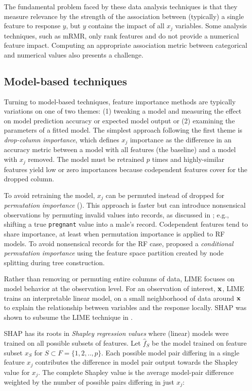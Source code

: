 \documentclass[11pt]{article}
\begin{document}
The fundamental problem faced by these data analysis techniques is that they measure relevance by the strength of the association between (typically) a single feature to response $y$, but $y$ contains the impact of all $x_j$ variables. Some analysis techniques, such as mRMR, only rank features and do not provide a numerical feature impact. Computing an appropriate association metric between categorical and numerical values also presents a challenge.

\subsection{Model-based techniques}

Turning to model-based techniques, feature importance methods are typically variations on one of two themes:  (1) tweaking a model and measuring the effect on model prediction accuracy or expected model output or (2) examining the parameters of a fitted model. The simplest approach following the first theme is {\em drop-column importance}, which defines $x_j$ importance as the difference in an accuracy metric between a model with all features (the baseline) and a model with $x_j$ removed. The model must be retrained $p$ times and highly-similar features yield low or zero importances because codependent features cover for the dropped column.

To avoid retraining the model, $x_j$ can be permuted instead of dropped for {\em permutation importance} (\citealt{RF}). This approach is faster but can introduce nonsensical observations by permuting invalid values into records, as discussed in \cite{stopperm}; e.g., shifting a true {\tt\small pregnant} value into a male's record. Codependent features tend to share importance, at least when permutation importance is applied to RF models. To avoid nonsensical records for the RF case, \cite{rfimp} proposed a {\em conditional permutation importance} using the feature space partition created by node splitting during tree construction.  

Rather than removing or permuting entire columns of data, LIME \citep{lime} focuses on model behavior at the observation level. For an observation of interest, $\bf x$, LIME trains an interpretable linear model, on a small neighborhood of data around $\bf x$ to explain the relationship between variables and the response locally. SHAP was shown to subsume the LIME technique in \citep{shap}. 

SHAP has its roots in {\em Shapley regression values} \citep{shapley-regression} where (linear) models were trained on all possible subsets of features. Let $\hat{f}_S$ be the model trained on feature subset $x_S$ for $S \subset F = \{1, 2, .., p\}$. Each possible model pair differing in a single feature $x_j$ contributes the difference in model pair output towards the Shapley value for $x_j$. The complete Shapley value is the average model-pair difference weighted by the number of possible pairs differing in just $x_j$:
\vspace{-1mm}
\end{document}
